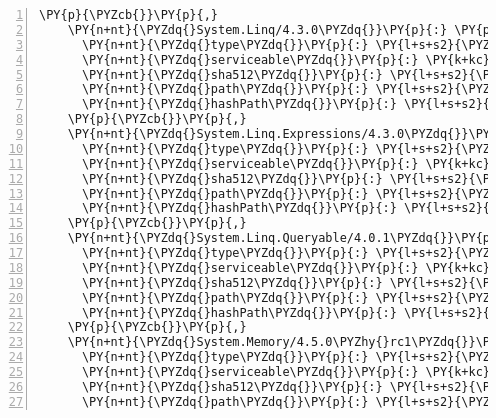 \begin{Verbatim}[commandchars=\\\{\},numbers=left,firstnumber=1,stepnumber=1,numberblanklines=0]
    \PY{p}{\PYZcb{}}\PY{p}{,}
    \PY{n+nt}{\PYZdq{}System.Linq/4.3.0\PYZdq{}}\PY{p}{:} \PY{p}{\PYZob{}}
      \PY{n+nt}{\PYZdq{}type\PYZdq{}}\PY{p}{:} \PY{l+s+s2}{\PYZdq{}package\PYZdq{}}\PY{p}{,}
      \PY{n+nt}{\PYZdq{}serviceable\PYZdq{}}\PY{p}{:} \PY{k+kc}{true}\PY{p}{,}
      \PY{n+nt}{\PYZdq{}sha512\PYZdq{}}\PY{p}{:} \PY{l+s+s2}{\PYZdq{}sha512\PYZhy{}5DbqIUpsDp0dFftytzuMmc0oeMdQwjcP/EWxsksIz/w1TcFRkZ3yKKz0PqiYFMmEwPSWw+qNVqD7PJ889JzHbw==\PYZdq{}}\PY{p}{,}
      \PY{n+nt}{\PYZdq{}path\PYZdq{}}\PY{p}{:} \PY{l+s+s2}{\PYZdq{}system.linq/4.3.0\PYZdq{}}\PY{p}{,}
      \PY{n+nt}{\PYZdq{}hashPath\PYZdq{}}\PY{p}{:} \PY{l+s+s2}{\PYZdq{}system.linq.4.3.0.nupkg.sha512\PYZdq{}}
    \PY{p}{\PYZcb{}}\PY{p}{,}
    \PY{n+nt}{\PYZdq{}System.Linq.Expressions/4.3.0\PYZdq{}}\PY{p}{:} \PY{p}{\PYZob{}}
      \PY{n+nt}{\PYZdq{}type\PYZdq{}}\PY{p}{:} \PY{l+s+s2}{\PYZdq{}package\PYZdq{}}\PY{p}{,}
      \PY{n+nt}{\PYZdq{}serviceable\PYZdq{}}\PY{p}{:} \PY{k+kc}{true}\PY{p}{,}
      \PY{n+nt}{\PYZdq{}sha512\PYZdq{}}\PY{p}{:} \PY{l+s+s2}{\PYZdq{}sha512\PYZhy{}PGKkrd2khG4CnlyJwxwwaWWiSiWFNBGlgXvJpeO0xCXrZ89ODrQ6tjEWS/kOqZ8GwEOUATtKtzp1eRgmYNfclg==\PYZdq{}}\PY{p}{,}
      \PY{n+nt}{\PYZdq{}path\PYZdq{}}\PY{p}{:} \PY{l+s+s2}{\PYZdq{}system.linq.expressions/4.3.0\PYZdq{}}\PY{p}{,}
      \PY{n+nt}{\PYZdq{}hashPath\PYZdq{}}\PY{p}{:} \PY{l+s+s2}{\PYZdq{}system.linq.expressions.4.3.0.nupkg.sha512\PYZdq{}}
    \PY{p}{\PYZcb{}}\PY{p}{,}
    \PY{n+nt}{\PYZdq{}System.Linq.Queryable/4.0.1\PYZdq{}}\PY{p}{:} \PY{p}{\PYZob{}}
      \PY{n+nt}{\PYZdq{}type\PYZdq{}}\PY{p}{:} \PY{l+s+s2}{\PYZdq{}package\PYZdq{}}\PY{p}{,}
      \PY{n+nt}{\PYZdq{}serviceable\PYZdq{}}\PY{p}{:} \PY{k+kc}{true}\PY{p}{,}
      \PY{n+nt}{\PYZdq{}sha512\PYZdq{}}\PY{p}{:} \PY{l+s+s2}{\PYZdq{}sha512\PYZhy{}Yn/WfYe9RoRfmSLvUt2JerP0BTGGykCZkQPgojaxgzF2N0oPo+/AhB8TXOpdCcNlrG3VRtsamtK2uzsp3cqRVw==\PYZdq{}}\PY{p}{,}
      \PY{n+nt}{\PYZdq{}path\PYZdq{}}\PY{p}{:} \PY{l+s+s2}{\PYZdq{}system.linq.queryable/4.0.1\PYZdq{}}\PY{p}{,}
      \PY{n+nt}{\PYZdq{}hashPath\PYZdq{}}\PY{p}{:} \PY{l+s+s2}{\PYZdq{}system.linq.queryable.4.0.1.nupkg.sha512\PYZdq{}}
    \PY{p}{\PYZcb{}}\PY{p}{,}
    \PY{n+nt}{\PYZdq{}System.Memory/4.5.0\PYZhy{}rc1\PYZdq{}}\PY{p}{:} \PY{p}{\PYZob{}}
      \PY{n+nt}{\PYZdq{}type\PYZdq{}}\PY{p}{:} \PY{l+s+s2}{\PYZdq{}package\PYZdq{}}\PY{p}{,}
      \PY{n+nt}{\PYZdq{}serviceable\PYZdq{}}\PY{p}{:} \PY{k+kc}{true}\PY{p}{,}
      \PY{n+nt}{\PYZdq{}sha512\PYZdq{}}\PY{p}{:} \PY{l+s+s2}{\PYZdq{}sha512\PYZhy{}AgFS/k74Hmw3T+gicCxj+e/YLvo2YYpAXsVXq+4C3g6xxWENxLM3ibdD5KrZwixZ0X36RLKtmmcx8tL6O7C+iQ==\PYZdq{}}\PY{p}{,}
      \PY{n+nt}{\PYZdq{}path\PYZdq{}}\PY{p}{:} \PY{l+s+s2}{\PYZdq{}system.memory/4.5.0\PYZhy{}rc1\PYZdq{}}\PY{p}{,}

\end{Verbatim}
